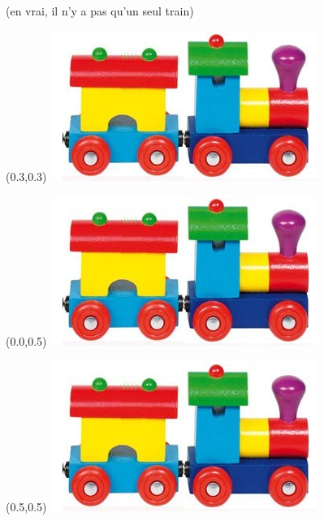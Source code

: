 \begin{frame}{\hfill(en vrai, il n'y a pas qu'un seul train)}
\begin{textblock*}{8em}
  \end{textblock*}
  \begin{textblock*}{12em}(0.3\textwidth,0.3\textheight)
    \includegraphics[width=\textwidth]{concepts/paquet.png}
  \end{textblock*}
  \begin{textblock*}{12em}(0.0\textwidth,0.5\textheight)
    \includegraphics[width=\textwidth]{concepts/paquet.png}
  \end{textblock*}
  \begin{textblock*}{12em}(0.5\textwidth,0.5\textheight)
    \includegraphics[width=\textwidth]{concepts/paquet.png}

\end{textblock*}
\end{frame}
